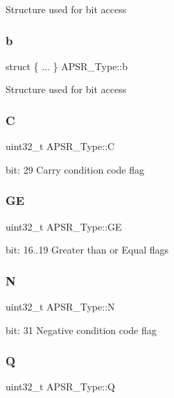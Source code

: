 Structure used for bit access \mbox{\label{union_a_p_s_r___type_a58bbe4a401dd92b53a0e9e2ab20486a9}} 
\subsubsection{\texorpdfstring{b}{b}\hspace{0.1cm}{\footnotesize\ttfamily [12/12]}}
{\footnotesize\ttfamily struct \{ ... \}   A\+P\+S\+R\+\_\+\+Type\+::b}

Structure used for bit access \mbox{\label{union_a_p_s_r___type_a86e2c5b891ecef1ab55b1edac0da79a6}} 
\subsubsection{\texorpdfstring{C}{C}}
{\footnotesize\ttfamily uint32\+\_\+t A\+P\+S\+R\+\_\+\+Type\+::C}

bit\+: 29 Carry condition code flag \mbox{\label{union_a_p_s_r___type_adcb98a5b9c93b0cb69cdb7af5638f32e}} 
\subsubsection{\texorpdfstring{GE}{GE}}
{\footnotesize\ttfamily uint32\+\_\+t A\+P\+S\+R\+\_\+\+Type\+::\+GE}

bit\+: 16..19 Greater than or Equal flags \mbox{\label{union_a_p_s_r___type_a7e7bbba9b00b0bb3283dc07f1abe37e0}} 
\subsubsection{\texorpdfstring{N}{N}}
{\footnotesize\ttfamily uint32\+\_\+t A\+P\+S\+R\+\_\+\+Type\+::N}

bit\+: 31 Negative condition code flag \mbox{\label{union_a_p_s_r___type_a22d10913489d24ab08bd83457daa88de}} 
\subsubsection{\texorpdfstring{Q}{Q}}
{\footnotesize\ttfamily uint32\+\_\+t A\+P\+S\+R\+\_\+\+Type\+::Q}

